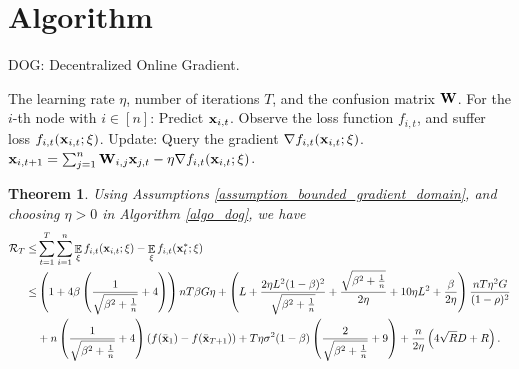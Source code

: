 \documentclass{article}
\newtheorem{Theorem}{\bf{Theorem}}
\begin{document}
\section{Algorithm}


\newcommand\StateX{\Statex\hspace{\algorithmicindent}}
\begin{algorithm}[!]
   \caption{DOG: Decentralized Online Gradient.}
   \label{algo_dog}
   \begin{algorithmic}[1]
   \Require The learning rate $\eta$, number of iterations $T$, and the confusion matrix ${\bf W}$.
           \StateX For the $i$-th node with $i\in[n]$:
            \State \indent Predict ${\bf x}_{i,t}$.
            \State \indent Observe the loss function $f_{i,t}$,
            \StateX \indent and suffer loss $f_{i,t}({\bf x}_{i,t};\xi)$.
            \StateX Update:
            \State \indent Query the gradient $\nabla f_{i,t}({\bf x}_{i,t};\xi)$.  
            \State \indent ${\bf x}_{i,t+1} = \sum_{j=1}^n {\bf W}_{i,j}{\bf x}_{j,t} - \eta \nabla f_{i,t}({\bf x}_{i,t};\xi)$. 
       \EndFor
   \end{algorithmic}
\end{algorithm}










\begin{Theorem}
\label{theorem_regret_upper_bound}
Using Assumptions \ref{assumption_bounded_gradient_domain}, and choosing $\eta>0$ in Algorithm \ref{algo_dog}, we have
\begin{align}
\nonumber
{\mathcal{R}}_T \le &  \sum_{t=1}^T\sum_{i=1}^n \mathop{\mathbb{E}}_{\xi}f_{i,t}({\bf x}_{i,t};\xi) - \mathop{\mathbb{E}}_{\xi}f_{i,t}({\bf x}_t^\ast;\xi) \\ \nonumber
\le & \left( 1 + 4\beta\left( \frac{1}{\sqrt{\beta^2 + \frac{1}{n}}}+4 \right) \right)nT\beta G \eta + \left(  L + \frac{2\eta L^2(1-\beta)^2}{\sqrt{\beta^2 + \frac{1}{n}}} + \frac{\sqrt{\beta^2 + \frac{1}{n}}}{2\eta} + 10\eta L^2  + \frac{\beta}{2\eta}  \right) \frac{nT \eta^2 G}{(1-\rho)^2} \\ \nonumber 
&+ n\left( \frac{1}{\sqrt{\beta^2 + \frac{1}{n}}} + 4 \right)\left( f(\bar{{\bf x}}_1) - f(\bar{{\bf x}}_{T+1}) \right) + T\eta \sigma^2 (1-\beta)\left( \frac{2}{\sqrt{\beta^2 + \frac{1}{n}}}+9 \right)   + \frac{n}{2\eta}\left(  4\sqrt{R}D + R   \right).
\end{align}


\end{Theorem}
\end{document}
